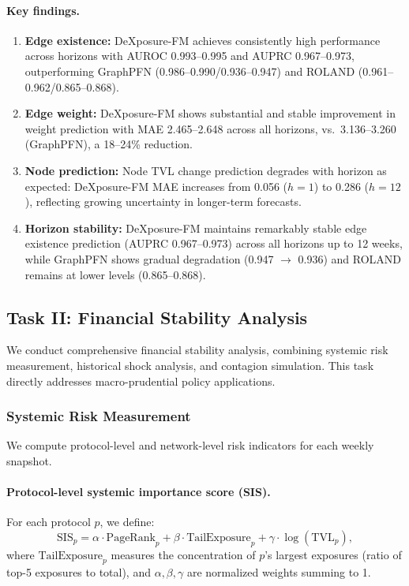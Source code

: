 \paragraph{Key findings.}
\begin{enumerate}
  \item \textbf{Edge existence:} DeXposure-FM achieves consistently high performance across horizons with AUROC 0.993--0.995 and AUPRC 0.967--0.973, outperforming GraphPFN (0.986--0.990/0.936--0.947) and ROLAND (0.961--0.962/0.865--0.868).
  \item \textbf{Edge weight:} DeXposure-FM shows substantial and stable improvement in weight prediction with MAE 2.465--2.648 across all horizons, vs.\ 3.136--3.260 (GraphPFN), a 18--24\% reduction.
  \item \textbf{Node prediction:} Node TVL change prediction degrades with horizon as expected: DeXposure-FM MAE increases from 0.056 ($h=1$) to 0.286 ($h=12$), reflecting growing uncertainty in longer-term forecasts.
  \item \textbf{Horizon stability:} DeXposure-FM maintains remarkably stable edge existence prediction (AUPRC 0.967--0.973) across all horizons up to 12 weeks, while GraphPFN shows gradual degradation (0.947 $\to$ 0.936) and ROLAND remains at lower levels (0.865--0.868).
\end{enumerate}

\subsection{Task II: Financial Stability Analysis}
\label{subsec:stability}

We conduct comprehensive financial stability analysis, combining systemic risk measurement, historical shock analysis, and contagion simulation. This task directly addresses macro-prudential policy applications.

\subsubsection{Systemic Risk Measurement}
\label{subsubsec:systemic-risk}

We compute protocol-level and network-level risk indicators for each weekly snapshot.

\paragraph{Protocol-level systemic importance score (SIS).}
For each protocol $p$, we define:
\begin{equation}
\text{SIS}_p = \alpha \cdot \text{PageRank}_p + \beta \cdot \text{TailExposure}_p + \gamma \cdot \log(\text{TVL}_p),
\label{eq:sis}
\end{equation}
where $\text{TailExposure}_p$ measures the concentration of $p$'s largest exposures (ratio of top-5 exposures to total), and $\alpha, \beta, \gamma$ are normalized weights summing to 1.

